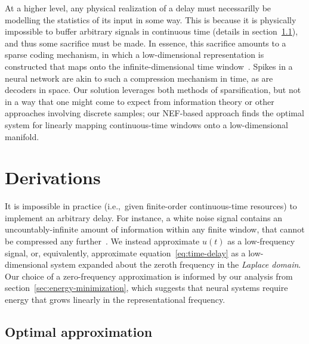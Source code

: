 At a higher level, any physical realization of a delay must necessarilly be modelling the statistics of its input in some way.
This is because it is physically impossible to buffer arbitrary signals in continuous time (details in section~\ref{sec:nef-delay}), and thus some sacrifice must be made.
In essence, this sacrifice amounts to a sparse coding mechanism, in which a low-dimensional representation is constructed that maps onto the infinite-dimensional time window~\citep{blumensath2009sampling}.
Spikes in a neural network are akin to such a compression mechanism in time, as are decoders in space.
Our solution leverages both methods of sparsification, but not in a way that one might come to expect from information theory or other approaches involving discrete samples; our NEF-based approach finds the optimal system for linearly mapping continuous-time windows onto a low-dimensional manifold.

\section{Derivations}
\label{sec:derivations}

It is impossible in practice (i.e.,~given finite-order continuous-time resources) to implement an arbitrary delay.
For instance, a white noise signal contains an uncountably-infinite amount of information within any finite window, that cannot be compressed any further~\citep{cover2012elements}.
We instead approximate $u(t)$ as a low-frequency signal, or, equivalently, approximate equation~\ref{eq:time-delay} as a low-dimensional system expanded about the zeroth frequency in the \emph{Laplace domain}.
Our choice of a zero-frequency approximation is informed by our analysis from section~\ref{sec:energy-minimization}, which suggests that neural systems require energy that grows linearly in the representational frequency.

\subsection{Optimal approximation}
\label{sec:nef-delay}

